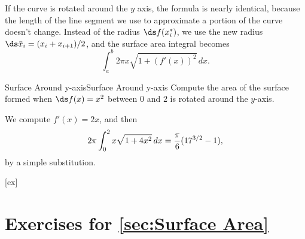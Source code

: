 If the curve is rotated around the $y$ axis, the formula is nearly
identical, because the length of the line segment we use to
approximate a portion of the curve doesn't change. Instead of the
radius $\ds f(x_i^*)$, we use the new radius $\ds \bar x_i=
(x_i+x_{i+1})/2$, and the surface area integral becomes
$$\int_a^b 2\pi x\sqrt{1+(f'(x))^2}\,dx.$$

\begin{example}{Surface Around y-axis}{Surface Around y-axis}\label{Surface Around y-axis}
Compute the area of the surface formed when $\ds f(x)
=x^2$ between $0$ and $2$ is rotated around the $y$-axis.
\end{example}

\begin{solution}
We compute $f'(x)= 2x$, and then
$$2\pi\int_0^2 x\sqrt{1+4x^2}\,dx={\pi\over6}(17^{3/2}-1),$$
by a simple substitution.
\end{solution}


[ex]
\section*{Exercises for \ref{sec:Surface Area}}

